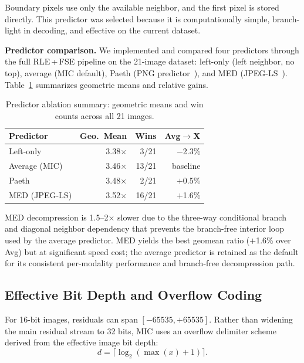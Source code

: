 \documentclass[journal]{IEEEtran}
\begin{document}
Boundary pixels use only the available neighbor, and the first pixel is stored
directly. This predictor was selected because it is computationally simple,
branch-light in decoding, and effective on the current dataset.

\textbf{Predictor comparison.} We implemented and compared four predictors
through the full RLE\,+\,FSE pipeline on the 21-image dataset: left-only (left
neighbor, no top), average (MIC default), Paeth (PNG predictor~\cite{png}), and
MED (JPEG-LS~\cite{loco1}). Table~\ref{tab:predictor-summary} summarizes
geometric means and relative gains.

\begin{table}[htbp]
\centering
\caption{Predictor ablation summary: geometric means and win counts across all
21 images.}
\label{tab:predictor-summary}
\begin{tabular}{lrrr}
\toprule
Predictor & Geo.\ Mean & Wins & Avg$\to$X \\
\midrule
Left-only & 3.38$\times$ & 3/21 & $-$2.3\% \\
Average (MIC) & 3.46$\times$ & 13/21 & baseline \\
Paeth & 3.48$\times$ & 2/21 & $+$0.5\% \\
MED (JPEG-LS) & 3.52$\times$ & 16/21 & $+$1.6\% \\
\bottomrule
\end{tabular}
\end{table}

MED decompression is 1.5--2$\times$ slower due to the three-way conditional
branch and diagonal neighbor dependency that prevents the branch-free interior
loop used by the average predictor. MED yields the best geomean ratio
($+$1.6\% over Avg) but at significant speed cost; the average predictor is
retained as the default for its consistent per-modality performance and
branch-free decompression path.

\subsection{Effective Bit Depth and Overflow Coding}

For 16-bit images, residuals can span $[-65535, +65535]$. Rather than widening
the main residual stream to 32 bits, MIC uses an overflow delimiter scheme
derived from the effective image bit depth:
\begin{equation}
  d = \lceil \log_2(\max(x) + 1) \rceil.
\end{equation}
\end{document}
